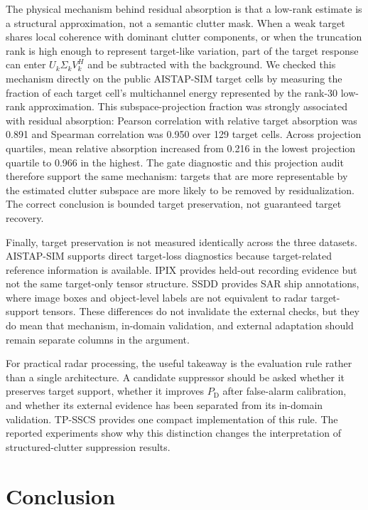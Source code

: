 \documentclass[journal]{IEEEtran}
\begin{document}
The physical mechanism behind residual absorption is that a low-rank estimate is a structural approximation, not a semantic clutter mask. When a weak target shares local coherence with dominant clutter components, or when the truncation rank is high enough to represent target-like variation, part of the target response can enter $U_k\Sigma_kV_k^H$ and be subtracted with the background. We checked this mechanism directly on the public AISTAP-SIM target cells by measuring the fraction of each target cell's multichannel energy represented by the rank-30 low-rank approximation. This subspace-projection fraction was strongly associated with residual absorption: Pearson correlation with relative target absorption was 0.891 and Spearman correlation was 0.950 over 129 target cells. Across projection quartiles, mean relative absorption increased from 0.216 in the lowest projection quartile to 0.966 in the highest. The gate diagnostic and this projection audit therefore support the same mechanism: targets that are more representable by the estimated clutter subspace are more likely to be removed by residualization. The correct conclusion is bounded target preservation, not guaranteed target recovery.

Finally, target preservation is not measured identically across the three datasets. AISTAP-SIM supports direct target-loss diagnostics because target-related reference information is available. IPIX provides held-out recording evidence but not the same target-only tensor structure. SSDD provides SAR ship annotations, where image boxes and object-level labels are not equivalent to radar target-support tensors. These differences do not invalidate the external checks, but they do mean that mechanism, in-domain validation, and external adaptation should remain separate columns in the argument.

For practical radar processing, the useful takeaway is the evaluation rule rather than a single architecture. A candidate suppressor should be asked whether it preserves target support, whether it improves $P_{\mathrm{D}}$ after false-alarm calibration, and whether its external evidence has been separated from its in-domain validation. TP-SSCS provides one compact implementation of this rule. The reported experiments show why this distinction changes the interpretation of structured-clutter suppression results.

\section{Conclusion}
\end{document}
